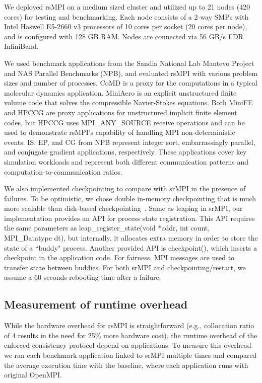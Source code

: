 We deployed rsMPI on a medium sized cluster and utilized up to 21 nodes (420 cores) for testing and benchmarking. Each node consists of a 2-way SMPs with Intel Haswell E5-2660 v3 processors of 10 cores per socket (20 cores per node), and is configured with 128 GB RAM. Nodes are connected via 56 GB/s FDR InfiniBand. %

We used benchmark applications from the Sandia National Lab Mantevo Project and NAS Parallel Benchmarks (NPB), and evaluated rsMPI with various problem sizes and number of processes. CoMD is a proxy for the computations in a typical molecular dynamics application. MiniAero is an explicit unstructured finite volume code that solves the compressible Navier-Stokes equations. Both MiniFE and HPCCG are proxy applications for unstructured implicit finite element codes, but HPCCG uses MPI\_ANY\_SOURCE receive operations and can be used to demonstrate rsMPI's capability of handling MPI non-deterministic events. IS, EP, and CG from NPB represent integer sort, embarrassingly parallel, and conjugate gradient applications, respectively. These applications cover key simulation workloads and represent both different communication patterns and computation-to-communication ratios.

We also implemented checkpointing to compare with srMPI in the presence of failures. To be optimistic, we chose double in-memory checkpointing that is much more scalable than disk-based checkpointing~\cite{zheng2004ftc}. Same as leaping in srMPI, our implementation provides an API for process state registration. This API requires the same parameters as leap\_register\_state(void *addr, int count, MPI\_Datatype dt), but internally, it allocates extra memory in order to store the state of a ``buddy" process. Another provided API is checkpoint(), which inserts a checkpoint in the application code. For fairness, MPI messages are used to transfer state between buddies.  
For both srMPI and checkpointing/restart, we assume a 60 seconds rebooting time after a failure. %

\subsection{Measurement of runtime overhead}
\label{sec:runtime_overhead}
While the hardware overhead for rsMPI is straightforward (e.g., collocation ratio of 4 results in the need for 25\% more hardware cost), the runtime overhead of the enforced consistency protocol depend on applications. To measure this overhead we ran each benchmark application linked to srMPI multiple times and compared the average execution time with the baseline, where each application runs with original OpenMPI.

